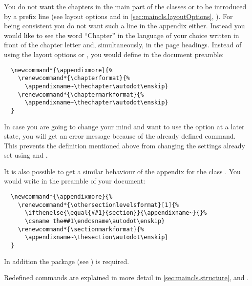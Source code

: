 \begin{Example}
  You do not want the chapters in the main part of the classes
   or  to be introduced by a prefix line
  (see layout options  and 
  in \autoref{sec:maincls.layoutOptions},
  ). For being consistent you
  do not want such a line in the appendix either. Instead you would like
  to see the word "`Chapter"' in the language of your choice written in
  front of the chapter letter and, simultaneously, in the page headings.
  Instead of using the layout options  or
  , you would define in the document preamble:
%
\begin{lstlisting}
  \newcommand*{\appendixmore}{%
    \renewcommand*{\chapterformat}{%
      \appendixname~\thechapter\autodot\enskip}
    \renewcommand*{\chaptermarkformat}{%
      \appendixname~\thechapter\autodot\enskip}
  }
\end{lstlisting}
%  
  In case you are going to change your mind and want to use the option
   at a later state, you will get an error
  message because of the already defined  command.
  This prevents the definition mentioned above from changing the
  settings already set using  and
  .
  
  It is also possible to get a similar behaviour of the appendix for
  the class . You would write in the preamble of your
  document:
\begin{lstlisting}
  \newcommand*{\appendixmore}{%
    \renewcommand*{\othersectionlevelsformat}[1]{%
      \ifthenelse{\equal{##1}{section}}{\appendixname~}{}%
      \csname the##1\endcsname\autodot\enskip}
    \renewcommand*{\sectionmarkformat}{%
      \appendixname~\thesection\autodot\enskip}
  }
\end{lstlisting}
  In addition the package  (see
  \cite{package:ifthen}) is required.
  
  Redefined commands are explained in more detail in
  \autoref{sec:maincls.structure}, 
  and .
\end{Example}
%
%


